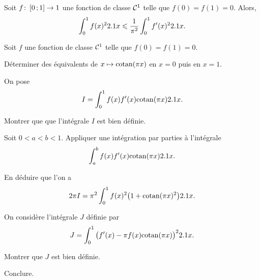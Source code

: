 \begin{prop}
Soit $\fonctionens[f]{\interff{0}{1}}{\R}$ une fonction de classe $\Cont^1$ telle que \mbox{$f(0) = f(1) = 0$}. Alors,
\[
\int_0^1 f(x)^2 \d x \leqslant \frac{1}{\pi^2} \int_0^1 f'(x)^2 \d x.
\]
\end{prop}

\begin{exercice}
Soit $f$ une fonction de classe $\Cont^1$ telle que $f(0) = f(1) = 0$.
\begin{questions}
\item Déterminer des équivalents de $x \mapsto \cotan(\pi x)$ en $x = 0$ puis en $x = 1$.
\end{questions}

On pose
\[
I = \int_0^1 f(x) f'(x) \cotan(\pi x) \d x.
\]

\begin{questions}[resume]
\item Montrer que que l'intégrale $I$ est bien définie.

\item Soit $0 < a < b < 1$. Appliquer une intégration par parties à l'intégrale
\[
\int_a^b f(x) f'(x) \cotan(\pi x) \d x.
\]

\item En déduire que l'on a
\[
2 \pi I = \pi^2 \int_0^1 f(x)^2 \big(1 + \cotan(\pi x)^2\big) \d x.
\]
\end{questions}

On considère l'intégrale $J$ définie par
\[
J = \int_0^1 \big(f'(x) - \pi f(x) \cotan(\pi x)\big)^2 \d x.
\]

\begin{questions}[resume]
\item Montrer que $J$ est bien définie.

\item Conclure.
\end{questions}
\end{exercice}

